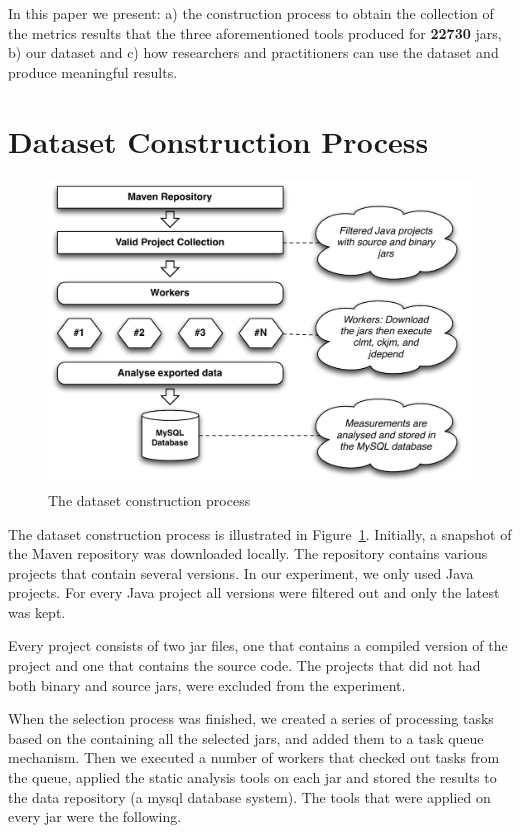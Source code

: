 \documentclass{sig-alternate}
\begin{document}
In this paper we present: a) the construction process to obtain the collection of the metrics results that the three aforementioned tools produced for {\bf 22730} {\sc jar}s, b) our dataset and c) how researchers and practitioners can use the dataset and produce meaningful results.

\section{Dataset Construction Process}
\label{sec:data}

\begin{figure}
\centering
\includegraphics[scale=0.6]{import-process}
\caption{The dataset construction process}
\label{fig:dataset-construction}
\end{figure}

The dataset construction process is illustrated in Figure~\ref{fig:dataset-construction}. Initially, a snapshot of the Maven repository was downloaded locally. The repository contains various projects that contain several versions. In our experiment, we only used Java projects. For every Java project
all versions were filtered out and only the latest was kept.

Every project consists of two {\sc jar} files, one that contains a compiled version of the project and one that contains the source code. The projects that did not had both binary and source jars, were excluded from the experiment.

When the selection process was finished, we created a series of processing tasks based on the containing all the selected {\sc jar}s, and added them to a task queue mechanism.  Then we executed a number of workers
that checked out tasks from the queue, applied the static analysis tools on each {\sc jar} and stored the results to the data repository (a {\sc m}y{\sc sql} database system). The tools that were applied on every {\sc jar} were the following.
\end{document}
